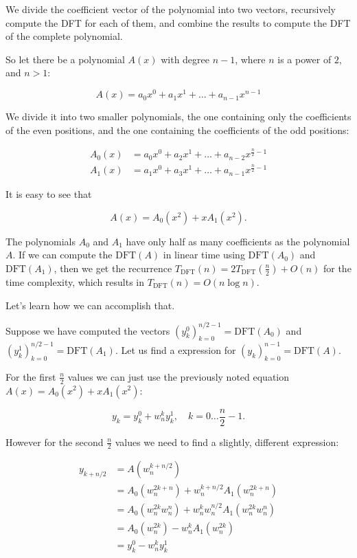 \documentclass[12pt]{article}
\theoremstyle{definition}
\begin{document}
We divide the coefficient vector of the polynomial into two vectors, recursively compute the DFT for each of them, and combine the results to compute the DFT of the complete polynomial.

So let there be a polynomial $A(x)$ with degree $n - 1$, where $n$ is a power of $2$, and $n > 1$:

$$A(x) = a_0 x^0 + a_1 x^1 + \dots + a_{n-1} x^{n-1}$$

We divide it into two smaller polynomials, the one containing only the coefficients of the even positions, and the one containing the coefficients of the odd positions:

\begin{align}
A_0(x) &= a_0 x^0 + a_2 x^1 + \dots + a_{n-2} x^{\frac{n}{2}-1} \\
A_1(x) &= a_1 x^0 + a_3 x^1 + \dots + a_{n-1} x^{\frac{n}{2}-1}
\end{align}


It is easy to see that

$$A(x) = A_0(x^2) + x A_1(x^2).$$

The polynomials $A_0$ and $A_1$ have only half as many coefficients as the polynomial $A$.
If we can compute the $\text{DFT}(A)$ in linear time using $\text{DFT}(A_0)$ and $\text{DFT}(A_1)$, then we get the recurrence $T_{\text{DFT}}(n) = 2 T_{\text{DFT}}\left(\frac{n}{2}\right) + O(n)$ for the time complexity, which results in $T_{\text{DFT}}(n) = O(n \log n)$.


Let's learn how we can accomplish that.

Suppose we have computed the vectors $\left(y_k^0\right)_{k=0}^{n/2-1} = \text{DFT}(A_0)$ and $\left(y_k^1\right)_{k=0}^{n/2-1} = \text{DFT}(A_1)$.
Let us find a expression for $\left(y_k\right)_{k=0}^{n-1} = \text{DFT}(A)$.

For the first $\frac{n}{2}$ values we can just use the previously noted equation $A(x) = A_0(x^2) + x A_1(x^2)$:

$$y_k = y_k^0 + w_n^k y_k^1, \quad k = 0 \dots \frac{n}{2} - 1.$$

However for the second $\frac{n}{2}$ values we need to find a slightly, different expression:

\begin{align}
y_{k+n/2} &= A\left(w_n^{k+n/2}\right) \\
&= A_0\left(w_n^{2k+n}\right) + w_n^{k + n/2} A_1\left(w_n^{2k+n}\right) \\
&= A_0\left(w_n^{2k} w_n^n\right) + w_n^k w_n^{n/2} A_1\left(w_n^{2k} w_n^n\right) \\
&= A_0\left(w_n^{2k}\right) - w_n^k A_1\left(w_n^{2k}\right) \\
&= y_k^0 - w_n^k y_k^1
\end{align}
\end{document}
